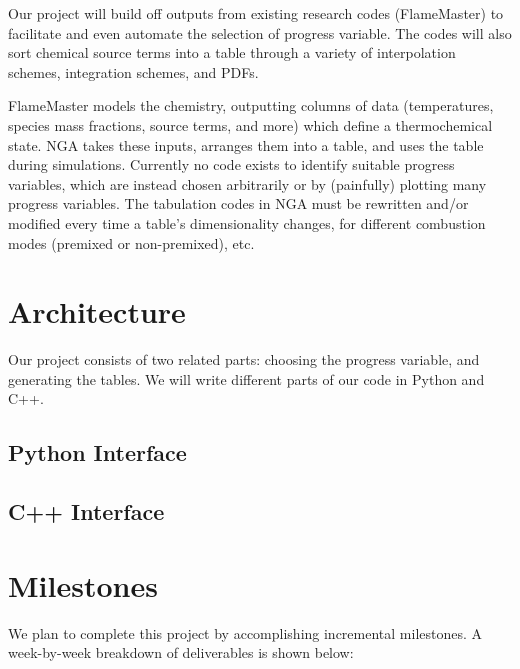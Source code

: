 \documentclass[11pt]{article}
\begin{document}
Our project will build off outputs from existing research codes
(FlameMaster) to facilitate and even automate the selection of
progress variable. The codes will also sort chemical source terms into
a table through a variety of interpolation schemes, integration
schemes, and PDFs. 



FlameMaster models the chemistry, outputting columns of data
(temperatures, species mass fractions, source terms, and more) which
define a thermochemical state. NGA takes these inputs, arranges them
into a table, and uses the table during simulations. Currently no code
exists to identify suitable progress variables, which are instead
chosen arbitrarily or by (painfully) plotting many progress
variables. The tabulation codes in NGA must be rewritten and/or
modified every time a table's dimensionality changes, for different
combustion modes (premixed or non-premixed), etc.


\section{Architecture}
Our project consists of two related parts: choosing the progress
variable, and generating the tables. We will write different parts of
our code in Python and C++.



\subsection{Python Interface}




\subsection{C++ Interface}



\section{Milestones}
We plan to complete this project by accomplishing incremental milestones. A week-by-week breakdown of deliverables is shown below:
\end{document}
